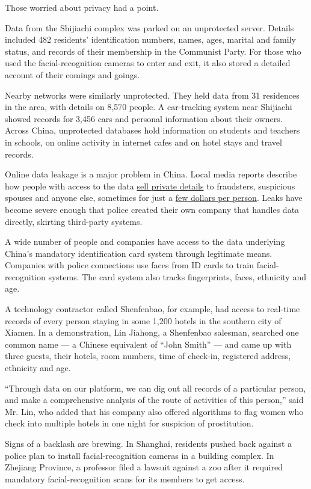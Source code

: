 Those worried about privacy had a point.

Data from the Shijiachi complex was parked on an unprotected server.
Details included 482 residents' identification numbers, names, ages,
marital and family status, and records of their membership in the
Communist Party. For those who used the facial-recognition cameras to
enter and exit, it also stored a detailed account of their comings and
goings.

Nearby networks were similarly unprotected. They held data from 31
residences in the area, with details on 8,570 people. A car-tracking
system near Shijiachi showed records for 3,456 cars and personal
information about their owners. Across China, unprotected databases hold
information on students and teachers in schools, on online activity in
internet cafes and on hotel stays and travel records.

Online data leakage is a major problem in China. Local media reports
describe how people with access to the data
\href{https://www.thepaper.cn/newsDetail_forward_5095971}{sell private
details} to fraudsters, suspicious spouses and anyone else, sometimes
for just a \href{https://wxn.qq.com/cmsid/NEW2016121200672607}{few
dollars per person}. Leaks have become severe enough that police created
their own company that handles data directly, skirting third-party
systems.

A wide number of people and companies have access to the data underlying
China's mandatory identification card system through legitimate means.
Companies with police connections use faces from ID cards to train
facial-recognition systems. The card system also tracks fingerprints,
faces, ethnicity and age.

A technology contractor called Shenfenbao, for example, had access to
real-time records of every person staying in some 1,200 hotels in the
southern city of Xiamen. In a demonstration, Lin Jiahong, a Shenfenbao
salesman, searched one common name --- a Chinese equivalent of ``John
Smith'' --- and came up with three guests, their hotels, room numbers,
time of check-in, registered address, ethnicity and age.

``Through data on our platform, we can dig out all records of a
particular person, and make a comprehensive analysis of the route of
activities of this person,'' said Mr. Lin, who added that his company
also offered algorithms to flag women who check into multiple hotels in
one night for suspicion of prostitution.

Signs of a backlash are brewing. In Shanghai, residents pushed back
against a police plan to install facial-recognition cameras in a
building complex. In Zhejiang Province, a professor filed a lawsuit
against a zoo after it required mandatory facial-recognition scans for
its members to get access.

